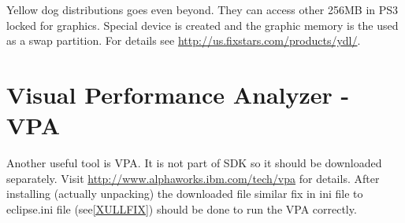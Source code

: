 Yellow dog distributions goes even beyond. They can access other 256MB in PS3 locked for graphics.
Special device is created and the graphic memory is the used as a swap partition. For details see \url{http://us.fixstars.com/products/ydl/}.

\section{Visual Performance Analyzer - VPA}

Another useful tool is VPA. It is not part of SDK so it should be downloaded separately.
Visit \url{http://www.alphaworks.ibm.com/tech/vpa} for details.
After installing (actually unpacking) the downloaded file similar fix in ini file to eclipse.ini file (see\ref{XULLFIX}) should be done to run the VPA correctly.